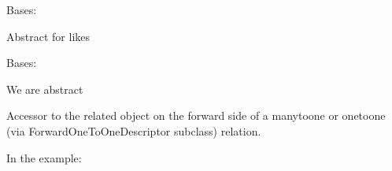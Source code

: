 \documentclass[letterpaper,10pt,english]{sphinxmanual}
\begin{document}
\begin{fulllineitems}
\label{\detokenize{forums:forums.models.AbstractLike}}
Bases: 

Abstract for likes

\begin{fulllineitems}
\label{\detokenize{forums:forums.models.AbstractLike.Meta}}
Bases: 

We are abstract

\begin{fulllineitems}
\label{\detokenize{forums:forums.models.AbstractLike.Meta.abstract}}
\end{fulllineitems}


\end{fulllineitems}


\begin{fulllineitems}
\label{\detokenize{forums:forums.models.AbstractLike.liker}}
Accessor to the related object on the forward side of a many\sphinxhyphen{}to\sphinxhyphen{}one or
one\sphinxhyphen{}to\sphinxhyphen{}one (via ForwardOneToOneDescriptor subclass) relation.

In the example:

\begin{sphinxVerbatim}[commandchars=\\\{\}]
 
       
\end{sphinxVerbatim}


\end{fulllineitems}
\end{fulllineitems}
\end{document}
